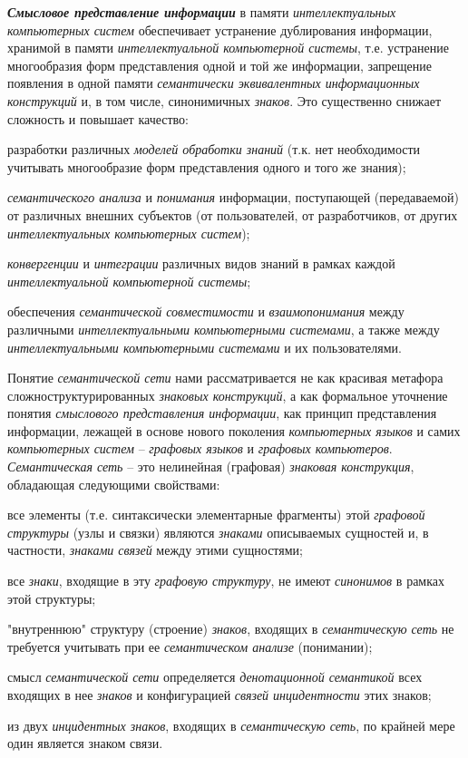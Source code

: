 \textbf{\textit{Смысловое представление информации}} в памяти \textit{интеллектуальных компьютерных систем} обеспечивает устранение дублирования информации, хранимой в памяти \textit{интеллектуальной компьютерной системы}, т.е. устранение многообразия форм представления одной и той же информации, запрещение появления в одной памяти \textit{семантически эквивалентных информационных конструкций} и, в том числе, синонимичных \textit{знаков}. Это существенно снижает сложность и повышает качество:

\begin{textitemize}
	\item
	разработки различных \textit{моделей обработки знаний} (т.к. нет необходимости учитывать многообразие форм представления одного и того же знания);
	\item
	\textit{семантического анализа} и \textit{понимания} информации, поступающей (передаваемой) от различных внешних субъектов (от пользователей, от разработчиков, от других \textit{интеллектуальных компьютерных систем});
	\item
	\textit{конвергенции} и \textit{интеграции} различных видов знаний в рамках каждой \textit{интеллектуальной компьютерной системы};
	\item
	обеспечения \textit{семантической совместимости} и \textit{взаимопонимания} между различными \textit{интеллектуальными компьютерными системами}, а также между \textit{интеллектуальными компьютерными системами} и их пользователями.
\end{textitemize}

Понятие \textit{семантической сети} нами рассматривается не как красивая метафора сложноструктурированных \textit{знаковых конструкций}, а как формальное уточнение понятия \textit{смыслового представления информации}, как принцип представления информации, лежащей в основе нового поколения \textit{компьютерных языков} и самих \textit{компьютерных систем} -- \textit{графовых языков} и \textit{графовых компьютеров}. \textit{Семантическая сеть} -- это нелинейная (графовая) \textit{знаковая конструкция}, обладающая следующими свойствами:

\begin{textitemize}
	\item
	все элементы (т.е. синтаксически элементарные фрагменты) этой \textit{графовой структуры} (узлы и связки) являются \textit{знаками} описываемых сущностей и, в частности, \textit{знаками связей} между этими сущностями;
	\item
	все \textit{знаки}, входящие в эту \textit{графовую структуру}, не имеют \textit{синонимов} в рамках этой структуры;
	\item
	"внутреннюю"{} структуру (строение) \textit{знаков}, входящих в \textit{семантическую сеть} не требуется учитывать при ее \textit{семантическом анализе} (понимании);
	\item
	смысл \textit{семантической сети} определяется \textit{денотационной семантикой} всех входящих в нее \textit{знаков} и конфигурацией \textit{связей инцидентности} этих знаков;
	\item
	из двух \textit{инцидентных знаков}, входящих в \textit{семантическую сеть}, по крайней мере один является знаком связи.
\end{textitemize}

